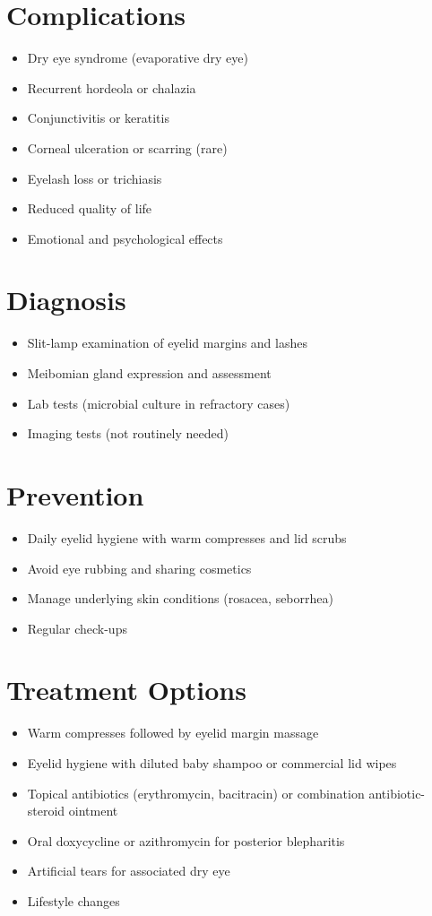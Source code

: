 \section{Complications}
\begin{itemize}[noitemsep]
  \item Dry eye syndrome (evaporative dry eye)
  \item Recurrent hordeola or chalazia
  \item Conjunctivitis or keratitis
  \item Corneal ulceration or scarring (rare)
  \item Eyelash loss or trichiasis
  \item Reduced quality of life
  \item Emotional and psychological effects
\end{itemize}

\section{Diagnosis}
\begin{itemize}[noitemsep]
  \item Slit-lamp examination of eyelid margins and lashes
  \item Meibomian gland expression and assessment
  \item Lab tests (microbial culture in refractory cases)
  \item Imaging tests (not routinely needed)
\end{itemize}

\section{Prevention}
\begin{itemize}[noitemsep]
  \item Daily eyelid hygiene with warm compresses and lid scrubs
  \item Avoid eye rubbing and sharing cosmetics
  \item Manage underlying skin conditions (rosacea, seborrhea)
  \item Regular check-ups
\end{itemize}

\section{Treatment Options}
\begin{itemize}[noitemsep]
  \item Warm compresses followed by eyelid margin massage
  \item Eyelid hygiene with diluted baby shampoo or commercial lid wipes
  \item Topical antibiotics (erythromycin, bacitracin) or combination antibiotic-steroid ointment
  \item Oral doxycycline or azithromycin for posterior blepharitis
  \item Artificial tears for associated dry eye
  \item Lifestyle changes
\end{itemize}

